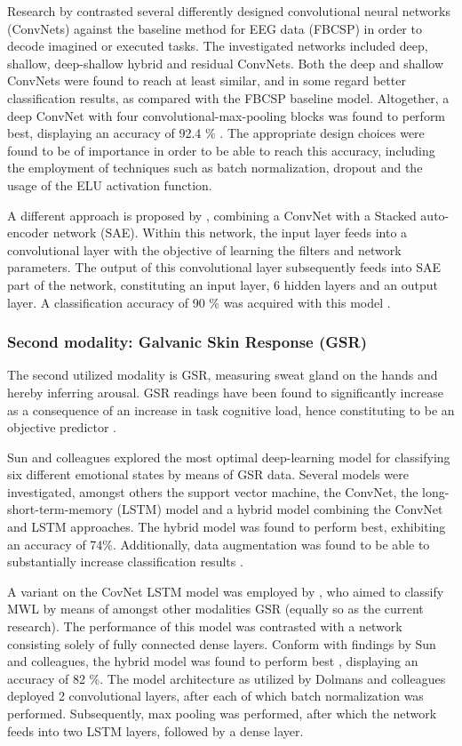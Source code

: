 \documentclass{article}
\begin{document}
Research by  contrasted several differently designed convolutional neural networks (ConvNets) against the baseline method for EEG data (FBCSP) in order to decode imagined or executed tasks. The investigated networks included deep, shallow, deep-shallow hybrid and residual ConvNets. Both the deep and shallow ConvNets were found to reach at least similar, and in some regard better classification results, as compared with the FBCSP baseline model. Altogether, a deep ConvNet with four convolutional-max-pooling blocks was found to perform best, displaying an accuracy of 92.4 \% \cite{schirrmeister2017deep}. The appropriate design choices were found to be of importance in order to be able to reach this accuracy, including the employment of techniques such as batch normalization, dropout and the usage of the ELU activation function.

A different approach is proposed by , combining a ConvNet with a Stacked auto-encoder network (SAE). Within this network, the input layer feeds into a convolutional layer with the objective of learning the filters and network parameters. The output of this convolutional layer subsequently feeds into SAE part of the network, constituting an input layer, 6 hidden layers and an output layer. A classification accuracy of 90 \% was acquired with this model \cite{tabar2016novel} . 

\subsubsection{Second modality: Galvanic Skin Response (GSR)}
The second utilized modality is GSR, measuring sweat gland on the hands and hereby inferring arousal. GSR readings have been found to significantly increase as a consequence of an increase in task cognitive load, hence constituting to be an objective predictor \cite{shi2007galvanic}. 

Sun and colleagues explored the most optimal deep-learning model for classifying six different emotional states by means of GSR data. Several models were investigated, amongst others the support vector machine, the ConvNet, the long-short-term-memory (LSTM) model and a hybrid model combining the ConvNet and LSTM approaches. The hybrid model was found to perform best, exhibiting an accuracy of 74\%. Additionally, data augmentation was found to be able to substantially increase classification results \cite{sun2019hybrid}. 

A variant on the CovNet LSTM model was employed by , who aimed to classify MWL by means of amongst other modalities GSR (equally so as the current research). The performance of this model was contrasted with a network consisting solely of fully connected dense layers. Conform with findings by Sun and colleagues, the hybrid model was found to perform best \cite{dolmans2020perceived}, displaying an accuracy of 82 \%. The model architecture as utilized by Dolmans and colleagues deployed 2 convolutional layers, after each of which batch normalization was performed. Subsequently, max pooling was performed, after which the network feeds into two LSTM layers, followed by a dense layer.
\end{document}
